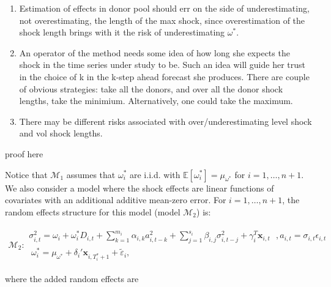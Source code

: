 \documentclass[11pt]{article}
\newcommand{\x}{\textbf{x}}
\def\mbf#1{\mathbf{#1}} %
\def\t#1{\tilde{#1}} %
\def\mc#1{\mathcal{#1}} %
\def\E{\mathbb{E}} %
\def\mc#1{\mathcal{#1}}
\theoremstyle{definition}
\newenvironment{proof-of-proposition}[1][{}]{\noindent{\bf
    Proof of Proposition {#1}}
  \hspace*{.5em}}{\qed\bigskip\\}
\begin{document}
\begin{enumerate}
\item Estimation of effects in donor pool should err on the side of underestimating, not overestimating, the length of the max shock, since overestimation of the shock length brings with it the risk of underestimating $\omega^{*}$.
\item An operator of the method needs some idea of how long she expects the shock in the time series under study to be.  Such an idea will guide her trust in the choice of k in the k-step ahead forecast she produces.  There are couple of obvious strategies: take all the donors, and over all the donor shock lengths, take the minimium.  Alternatively, one could take the maximum.
\item There may be different risks associated with over/underestimating level shock and vol shock lengths.
\end{enumerate}

\begin{proof-of-proposition}
proof here
\end{proof-of-proposition}


Notice that $\mc{M}_1$ assumes that $\omega^{*}_i$ are i.i.d. with $\E[ \omega^{*}_i]=\mu_{\omega^{*}}$ 
for $i = 1, \ldots, n+1$. We also consider a model where the shock effects are linear functions of covariates with an additional additive mean-zero error. For $i = 1, \ldots, n+1$, the random effects structure for this model (model $\mc{M}_2$) is:




\begin{align}
\mc{M}_2 \colon \begin{array}{l}
   \sigma^{2}_{i,t} = \omega_{i} + \omega^{*}_i D_{i,t}  + \sum^{m_{i}}_{k=1}\alpha_{i,k}a^{2}_{i,t-k} + \sum_{j=1}^{s_{i}}\beta_{i,j}\sigma_{i,t-j}^{2} + \gamma_{i}^{T} \x_{i,t} \text{ }, a_{i,t} = \sigma_{i,t}\epsilon_{i,t}\\[.2cm]
  \; \omega_i^{*} = \mu_{\omega^{*}}+\delta_{i}'\mbf{x}_{i, T_i^*+1}+ \t{\varepsilon}_{i},
\end{array}\label{model2}
\end{align}

 where the added random effects are
\end{document}
